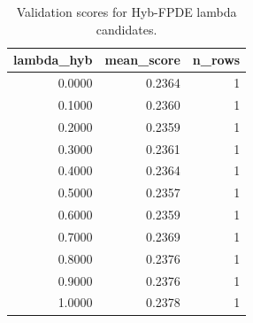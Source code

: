 \begin{table}[t]
\caption{Validation scores for Hyb-FPDE lambda candidates.}
\label{tab:lambda_distribution_computed}
\centering
\begin{tabular}{rrr}
\toprule
lambda\_hyb & mean\_score & n\_rows \\
\midrule
0.0000 & 0.2364 & 1 \\
0.1000 & 0.2360 & 1 \\
0.2000 & 0.2359 & 1 \\
0.3000 & 0.2361 & 1 \\
0.4000 & 0.2364 & 1 \\
0.5000 & 0.2357 & 1 \\
0.6000 & 0.2359 & 1 \\
0.7000 & 0.2369 & 1 \\
0.8000 & 0.2376 & 1 \\
0.9000 & 0.2376 & 1 \\
1.0000 & 0.2378 & 1 \\
\bottomrule
\end{tabular}

\end{table}
